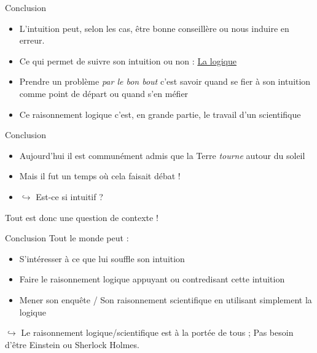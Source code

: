\documentclass[usenames, dvipsnames, no-framenumber]{beamer}
\begin{document}
\begin{frame}%
{Conclusion}
\begin{itemize}
\item L'intuition peut, selon les cas, être bonne conseillère ou nous induire en erreur. \pause
\item Ce qui permet de suivre son intuition ou non : \underline{La logique} \pause 
\item Prendre un problème \textit{par le bon bout} c'est savoir quand se fier à son intuition comme point de départ ou quand s'en méfier \pause 
\item Ce raisonnement logique c'est, en grande partie, le travail d'un scientifique
\end{itemize}



\end{frame}




\begin{frame}%
{Conclusion}

\begin{itemize}
\item Aujourd'hui il est communément admis que la Terre \textit{tourne} autour du soleil \pause
\item Mais il fut un temps où cela faisait débat ! \pause
\item $\hookrightarrow$ Est-ce si intuitif ? \pause 
\end{itemize}


\vspace{2cm} Tout est donc une question de contexte ! 
\end{frame}



\begin{frame}%
{Conclusion}
Tout le monde peut : 
\begin{itemize}
\item S'intéresser à ce que lui souffle son intuition \pause
\item Faire le raisonnement logique appuyant ou contredisant cette intuition \pause 
\item Mener son enquête / Son raisonnement scientifique en utilisant simplement la logique
\end{itemize}
\pause $\hookrightarrow$ Le raisonnement logique/scientifique est à la portée de tous ; Pas besoin d'être Einstein ou Sherlock Holmes.
\end{frame} 
\end{document}
